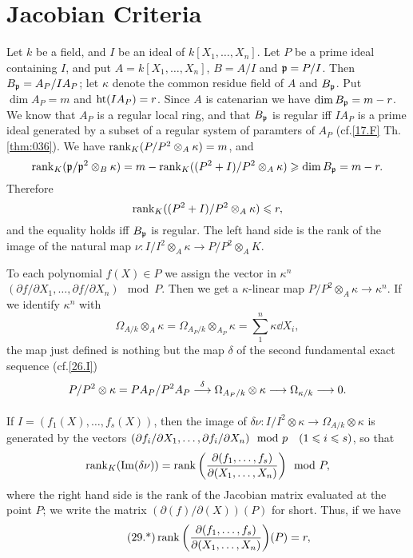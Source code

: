 \documentclass[../main]{subfiles}
\begin{document}
\section{Jacobian Criteria}\label{sec:29}
\newparagraph Let $k$ be a field, and $I$ be an ideal of $k[X_1, \ldots, X_n]$. Let $P$ be a prime ideal containing $I$, and put $A = k[X_1, \ldots, X_n]$, $B = A/I$ and $\mathfrak{p} = P/I$. Then $B_{\mathfrak{p}} = A_P/I A_P$; let $\kappa$ denote the common residue field of $A$ and $B_{\mathfrak{p}}$. Put $\dim A_P = m$ and $\operatorname{ht}(I A_P) = r$. Since $A$ is catenarian we have $\operatorname{dim} B_{\mathfrak{p}} = m - r$. We know that $A_P$ is a regular local ring, and that $B_{\mathfrak{p}}$ is regular iff $IA_P$ is a prime ideal generated by a subset of a regular system of paramters of $A_P$ (cf.\ref{17.F} Th.\ref{thm:036}). We have $\operatorname{rank}_K(P/P^2 \otimes_A \kappa) = m$, and
\[
\operatorname{rank}_K(\mathfrak{p}/\mathfrak{p}^2 \otimes_B \kappa) = m - \operatorname{rank}_K ((P^2 + I)/P^2 \otimes_A \kappa) \geqslant \operatorname{dim} B_{\mathfrak{p}} = m - r.
\]
Therefore
\[
\operatorname{rank}_K ((P^2 + I)/P^2 \otimes_A \kappa) \leqslant r,
\]
and the equality holds iff $B_{\mathfrak{p}}$ is regular. The left hand side is the rank of the image of the natural map $\nu : I/I^2 \otimes_A \kappa \longrightarrow P/P^2 \otimes_A K$. 

To each polynomial $f(X) \in P$ we assign the vector in $\kappa^n$ $(\partial f/\partial X_1, \ldots, \partial f/\partial X_n) \mod P$. Then we get a $\kappa$-linear map $P/P^2 \otimes_A \kappa \longrightarrow \kappa^n$. If we identify $\kappa^n$ with \[\Omega_{A/k} \otimes_A \kappa = \Omega_{A_P/k} \otimes_{A_P} \kappa = \sum\limits_1^n \kappa \dd X_i,\] the map just defined is nothing but the map $\delta$ of the second fundamental exact sequence (cf.\ref{26.I})
\[
P/P^2 \otimes \kappa = P A_P/P^2 A_P \varrightarrow{\delta} \Omega_{A_P/k} \otimes \kappa \longrightarrow \Omega_{\kappa/k} \longrightarrow 0.
\]

If $I = (f_1(X), \ldots, f_s(X))$, then the image of $\delta \nu : I/I^2 \otimes \kappa \longrightarrow \Omega_{A/k} \otimes \kappa$ is generated by the vectors $(\partial f_i/\partial X_1, \ldots, \partial f_i/\partial X_n) \mod p\for{1 \le i \le s}$, so that \[\operatorname{rank}_K(\operatorname{Im}(\delta \nu)) = \operatorname{rank}\bigg(\dfrac{\partial(f_1, \dots, f_s)}{\partial (X_1, \dots, X_n)}\bigg) \mod P,\] where the right hand side is the rank of the Jacobian matrix evaluated at the point $P$; we write the matrix $(\partial(f)/\partial(X))(P)$ for short. Thus, if we have 
\begin{equation}
\label{eqn:s29}
\tag{29.*}
\operatorname{rank}\bigg(\dfrac{\partial(f_1, \dots, f_s)}{\partial (X_1, \dots, X_n)}\bigg)(P) = r,
\end{equation}
\end{document}
